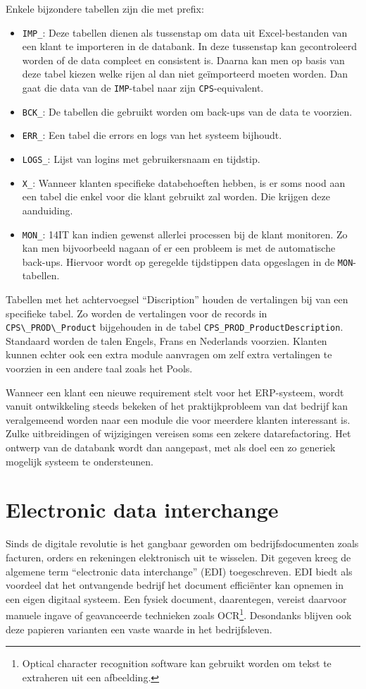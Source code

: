 Enkele bijzondere tabellen zijn die met prefix:
\begin{itemize}
	\item \verb*|IMP_|: Deze tabellen dienen als tussenstap om data uit Excel-bestanden van een klant te importeren in de databank. In deze tussenstap kan gecontroleerd worden of de data compleet en consistent is. Daarna kan men op basis van deze tabel kiezen welke rijen al dan niet geïmporteerd moeten worden. Dan gaat die data van de \verb*|IMP|-tabel naar zijn \verb*|CPS|-equivalent.
	\item \verb*|BCK_|: De tabellen die gebruikt worden om back-ups van de data te voorzien.
	\item \verb*|ERR_|: Een tabel die errors en logs van het systeem bijhoudt.
	\item \verb*|LOGS_|: Lijst van logins met gebruikersnaam en tijdstip.
	\item \verb*|X_|: Wanneer klanten specifieke databehoeften hebben, is er soms nood aan een tabel die enkel voor die klant gebruikt zal worden. Die krijgen deze aanduiding.
	\item \verb*|MON_|: 14IT kan indien gewenst allerlei processen bij de klant monitoren. Zo kan men bijvoorbeeld nagaan of er een probleem is met de automatische back-ups. Hiervoor wordt op geregelde tijdstippen data opgeslagen in de \verb*|MON|-tabellen. 
\end{itemize}

Tabellen met het achtervoegsel ``Discription'' houden de vertalingen bij van een specifieke tabel. Zo worden de vertalingen voor de records in \verb*|CPS\_PROD\_Product| bijgehouden in de tabel \verb*|CPS_PROD_ProductDescription|. Standaard worden de talen Engels, Frans en Nederlands voorzien. Klanten kunnen echter ook een extra module aanvragen om zelf extra vertalingen te voorzien in een andere taal zoals het Pools.

Wanneer een klant een nieuwe requirement stelt voor het ERP-systeem, wordt vanuit ontwikkeling steeds bekeken of het praktijkprobleem van dat bedrijf kan veralgemeend worden naar een module die voor meerdere klanten interessant is. Zulke uitbreidingen of wijzigingen vereisen soms een zekere datarefactoring. Het ontwerp van de databank wordt dan aangepast, met als doel een zo generiek mogelijk systeem te ondersteunen. 


\section{Electronic data interchange}
\label{sec:electronic-data-interchange}
Sinds de digitale revolutie is het gangbaar geworden om bedrijfsdocumenten zoals facturen, orders en rekeningen elektronisch uit te wisselen. Dit gegeven kreeg de algemene term ``electronic data interchange'' (EDI) toegeschreven. 
EDI biedt als voordeel dat het ontvangende bedrijf het document efficiënter kan opnemen in een eigen digitaal systeem. Een fysiek document, daarentegen, vereist daarvoor manuele ingave of geavanceerde technieken zoals OCR\footnote{Optical character recognition software kan gebruikt worden om tekst te extraheren uit een afbeelding.}. Desondanks blijven ook deze papieren varianten een vaste waarde in het bedrijfsleven.


